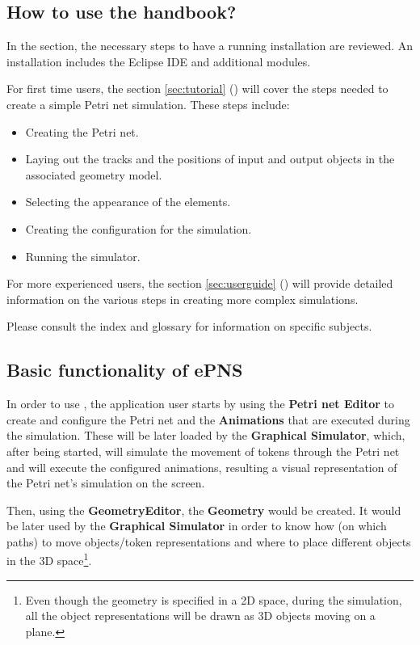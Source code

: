 \subsection{How to use the handbook?}

In the  section, the necessary steps to have a running
installation are reviewed. An installation includes the Eclipse IDE and additional modules. 

For first time users, the section \ref{sec:tutorial} () will cover 
the steps needed to create a simple Petri net simulation. These steps include:
\begin{itemize}
  \item Creating the Petri net.
  \item Laying out the tracks and the positions of input and output objects in the associated geometry model.
  \item Selecting the appearance of the elements.
  \item Creating the configuration for the simulation.
  \item Running the simulator.
\end{itemize}

For more experienced users, the section \ref{sec:userguide} () will provide
detailed information on the various steps in creating more complex simulations. 

Please consult the index and glossary for information on specific subjects.

\subsection{Basic functionality of ePNS}
In order to use \epns, the application user starts by using the \textbf{Petri net Editor} to create
and configure the Petri net and the \textbf{Animations} that are executed during the simulation.
These will be later loaded by the \textbf{Graphical Simulator}, which, after being started, will
simulate the movement of tokens through the Petri net and will execute the configured animations,
resulting a visual representation of the Petri net's simulation on the screen.

Then, using the \textbf{GeometryEditor}, the \textbf{Geometry} would be created. It would be later
used by the \textbf{Graphical Simulator} in order to know how (on which paths) to move objects/token
representations and where to place different objects in the 3D space\footnote{Even though the
geometry is specified in a 2D space, during the simulation, all the object representations will be
drawn as 3D objects moving on a plane.}.

